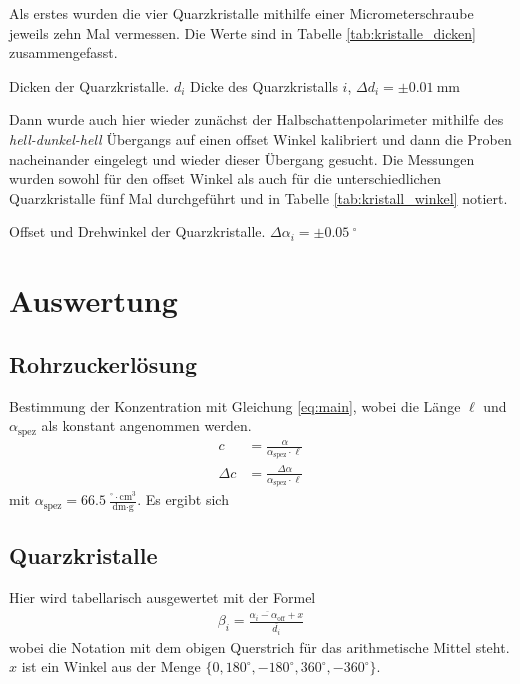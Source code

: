 \documentclass{article}
\newcommand{\as}{\alpha_\text{spez}}
\begin{document}
Als erstes wurden die vier Quarzkristalle mithilfe einer Micrometerschraube jeweils zehn Mal vermessen. Die Werte sind in Tabelle \ref{tab:kristalle_dicken} zusammengefasst.

\begin{table}[H]
\caption{Dicken der Quarzkristalle. $d_i$ Dicke des Quarzkristalls $i$, $\Delta d_i = \pm 0.01~$mm }
\label{tab:kristalle_dicken}
\centering

\end{table}


Dann wurde auch hier wieder zunächst der Halbschattenpolarimeter mithilfe des \textit{hell-dunkel-hell} Übergangs auf einen offset Winkel kalibriert und dann die Proben nacheinander eingelegt und wieder dieser Übergang gesucht. Die Messungen wurden sowohl für den offset Winkel als auch für die unterschiedlichen Quarzkristalle fünf Mal durchgeführt und in Tabelle \ref{tab:kristall_winkel} notiert.



\begin{table}[H]
\caption{Offset und Drehwinkel der Quarzkristalle. $\Delta\alpha_i = \pm 0.05~^\circ$}
\label{tab:kristall_winkel}
\centering

\end{table}


\section{Auswertung}


\subsection{Rohrzuckerlösung}


Bestimmung der Konzentration mit Gleichung \eqref{eq:main}, wobei die Länge $\ell$ und $\as$ als konstant angenommen werden.
\begin{align*}
c &= \frac{\alpha}{\as\cdot \ell} \\
\Delta c &= \frac{\Delta \alpha}{\as\cdot \ell}
\end{align*}
mit $\as = 66.5~\frac{{}^\circ\cdot \text{cm}^3}{\text{dm}\cdot \text{g}}$. Es ergibt sich



\subsection{Quarzkristalle}

Hier wird tabellarisch ausgewertet mit der Formel
\begin{align*}
\beta_i = \frac{\overline{\alpha_i-\alpha_{\text{off}}} + x}{\overline{d_i}}
\end{align*}
wobei die Notation mit dem obigen Querstrich für das arithmetische Mittel steht. $x$ ist ein Winkel aus der Menge $\{0, 180^\circ, -180^\circ, 360^\circ, -360^\circ\}$.
\end{document}
